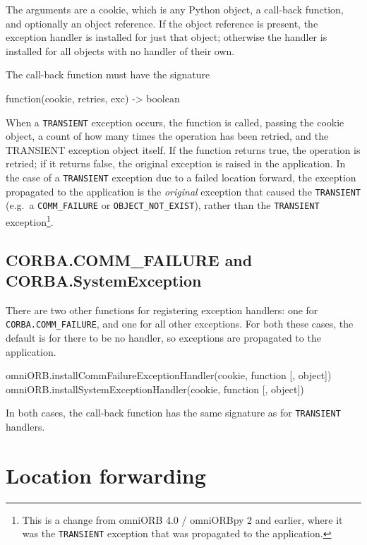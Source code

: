 \documentclass[11pt,twoside,a4paper]{book}
\newcommand{\code}[1]{\texttt{#1}}
\newcommand{\dsc}{\discretionary{}{}{}}
\begin{document}
The arguments are a cookie, which is any Python object, a call-back
function, and optionally an object reference. If the object reference
is present, the exception handler is installed for just that object;
otherwise the handler is installed for all objects with no handler of
their own.

The call-back function must have the signature

\begin{pylisting}
function(cookie, retries, exc) -> boolean
\end{pylisting}

When a \code{TRANSIENT} exception occurs, the function is called,
passing the cookie object, a count of how many times the operation has
been retried, and the TRANSIENT exception object itself. If the
function returns true, the operation is retried; if it returns false,
the original exception is raised in the application. In the case of a
\code{TRANSIENT} exception due to a failed location forward, the
exception propagated to the application is the \emph{original}
exception that caused the \code{TRANSIENT} (e.g.\ a
\code{COMM\_FAILURE} or \code{OBJECT\_NOT\_EXIST}), rather than the
\code{TRANSIENT} exception\footnote{This is a change from omniORB 4.0
/ omniORBpy 2 and earlier, where it was the \code{TRANSIENT} exception
that was propagated to the application.}.



\subsection{CORBA.COMM\_FAILURE and CORBA.SystemException}

There are two other functions for registering exception handlers: one
for \code{CORBA.\dsc{}COMM\_FAILURE}, and one for all other
exceptions. For both these cases, the default is for there to be no
handler, so exceptions are propagated to the application.

\begin{pylisting}
omniORB.installCommFailureExceptionHandler(cookie, function [, object])
omniORB.installSystemExceptionHandler(cookie, function [, object])
\end{pylisting}

\noindent In both cases, the call-back function has the same signature
as for \code{TRANSIENT} handlers.



\section{Location forwarding}
\label{sec:locationForward}
\end{document}
